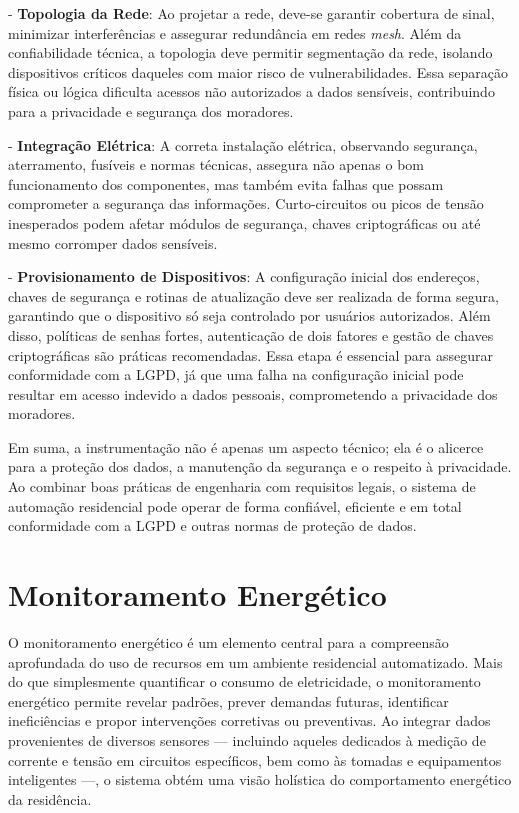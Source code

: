 - \textbf{Topologia da Rede}: Ao projetar a rede, deve-se garantir cobertura de sinal, minimizar interferências e assegurar redundância em redes \textit{mesh}. Além da confiabilidade técnica, a topologia deve permitir segmentação da rede, isolando dispositivos críticos daqueles com maior risco de vulnerabilidades. Essa separação física ou lógica dificulta acessos não autorizados a dados sensíveis, contribuindo para a privacidade e segurança dos moradores.

- \textbf{Integração Elétrica}: A correta instalação elétrica, observando segurança, aterramento, fusíveis e normas técnicas, assegura não apenas o bom funcionamento dos componentes, mas também evita falhas que possam comprometer a segurança das informações. Curto-circuitos ou picos de tensão inesperados podem afetar módulos de segurança, chaves criptográficas ou até mesmo corromper dados sensíveis.

- \textbf{Provisionamento de Dispositivos}: A configuração inicial dos endereços, chaves de segurança e rotinas de atualização deve ser realizada de forma segura, garantindo que o dispositivo só seja controlado por usuários autorizados. Além disso, políticas de senhas fortes, autenticação de dois fatores e gestão de chaves criptográficas são práticas recomendadas. Essa etapa é essencial para assegurar conformidade com a LGPD, já que uma falha na configuração inicial pode resultar em acesso indevido a dados pessoais, comprometendo a privacidade dos moradores.

Em suma, a instrumentação não é apenas um aspecto técnico; ela é o alicerce para a proteção dos dados, a manutenção da segurança e o respeito à privacidade. Ao combinar boas práticas de engenharia com requisitos legais, o sistema de automação residencial pode operar de forma confiável, eficiente e em total conformidade com a LGPD e outras normas de proteção de dados.

\section{Monitoramento Energético}
\label{sec:monitoramento_energetico}

O monitoramento energético é um elemento central para a compreensão aprofundada do uso de recursos em um ambiente residencial automatizado. Mais do que simplesmente quantificar o consumo de eletricidade, o monitoramento energético permite revelar padrões, prever demandas futuras, identificar ineficiências e propor intervenções corretivas ou preventivas. Ao integrar dados provenientes de diversos sensores — incluindo aqueles dedicados à medição de corrente e tensão em circuitos específicos, bem como às tomadas e equipamentos inteligentes —, o sistema obtém uma visão holística do comportamento energético da residência.


